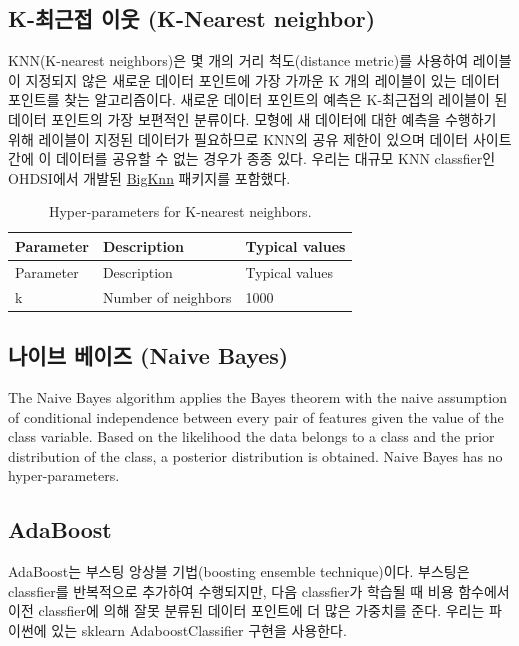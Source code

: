 \documentclass[11pt]{book}
\theoremstyle{definition}
\theoremstyle{definition}
\theoremstyle{definition}
\theoremstyle{remark}
\begin{document}
\subsection{K-최근접 이웃 (K-Nearest
neighbor)}\label{k---k-nearest-neighbor}

KNN(K-nearest neighbors)은 몇 개의 거리 척도(distance metric)를 사용하여
레이블이 지정되지 않은 새로운 데이터 포인트에 가장 가까운 K 개의
레이블이 있는 데이터 포인트를 찾는 알고리즘이다. 새로운 데이터 포인트의
예측은 K-최근접의 레이블이 된 데이터 포인트의 가장 보편적인 분류이다.
모형에 새 데이터에 대한 예측을 수행하기 위해 레이블이 지정된 데이터가
필요하므로 KNN의 공유 제한이 있으며 데이터 사이트 간에 이 데이터를
공유할 수 없는 경우가 종종 있다. 우리는 대규모 KNN classfier인 OHDSI에서
개발된 \href{https://github.com/OHDSI/BigKnn}{BigKnn} 패키지를
포함했다. 

\begin{longtable}[]{@{}lll@{}}
\caption{\label{tab:knnParameters} Hyper-parameters for K-nearest
neighbors.}\tabularnewline
\toprule
Parameter & Description & Typical values\tabularnewline
\midrule
\endfirsthead
\toprule
Parameter & Description & Typical values\tabularnewline
\midrule
\endhead
k & Number of neighbors & 1000\tabularnewline
\bottomrule
\end{longtable}

\subsection{나이브 베이즈 (Naive Bayes)}\label{--naive-bayes}

The Naive Bayes algorithm applies the Bayes theorem with the naive
assumption of conditional independence between every pair of features
given the value of the class variable. Based on the likelihood the data
belongs to a class and the prior distribution of the class, a posterior
distribution is obtained. Naive Bayes has no hyper-parameters.

\subsection{AdaBoost}\label{adaboost}

AdaBoost는 부스팅 앙상블 기법(boosting ensemble technique)이다. 부스팅은
classfier를 반복적으로 추가하여 수행되지만, 다음 classfier가 학습될 때
비용 함수에서 이전 classfier에 의해 잘못 분류된 데이터 포인트에 더 많은
가중치를 준다. 우리는 파이썬에 있는 sklearn AdaboostClassifier 구현을
사용한다.  
\end{document}
